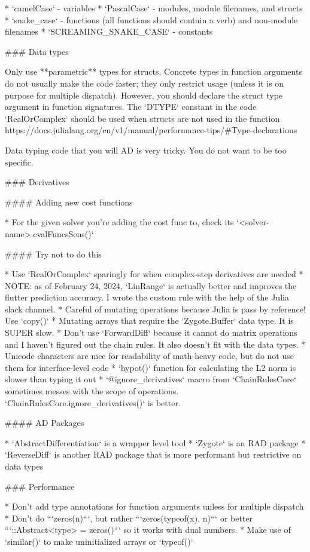 \documentclass[10pt]{article}
\begin{document}
* `camelCase` - variables
* `PascalCase` - modules, module filenames, and structs
* `snake_case` - functions (all functions should contain a verb) and non-module filenames
* `SCREAMING_SNAKE_CASE` - constants

### Data types

Only use **parametric** types for structs. Concrete types in function arguments do not usually make the code faster; they only restrict usage (unless it is on purpose for multiple dispatch). However, you should declare the struct type argument in function signatures. The `DTYPE` constant in the code `RealOrComplex` should be used when structs are not used in the function
https://docs.julialang.org/en/v1/manual/performance-tips/#Type-declarations

Data typing code that you will AD is very tricky.
You do not want to be too specific.

### Derivatives

#### Adding new cost functions

* For the given solver you're adding the cost func to, check its `<solver-name>.evalFuncsSens()`

#### Try not to do this

* Use `RealOrComplex` sparingly for when complex-step derivatives are needed
* NOTE: as of February 24, 2024, `LinRange` is actually better and improves the flutter prediction accuracy.
I wrote the custom rule with the help of the Julia slack channel.
* Careful of mutating operations because Julia is pass by reference! Use `copy()`
* Mutating arrays that require the `Zygote.Buffer` data type. It is SUPER slow.
* Don't use `ForwardDiff` because it cannot do matrix operations and I haven't figured out the chain rules.
It also doesn't fit with the data types.
* Unicode characters are nice for readability of math-heavy code, but do not use them for interface-level code
* `hypot()` function for calculating the L2 norm is slower than typing it out
* `@ignore_derivatives` macro from `ChainRulesCore` sometimes messes with the scope of operations. `ChainRulesCore.ignore_derivatives()` is better.

#### AD Packages

* `AbstractDifferentiation` is a wrapper level tool
* `Zygote` is an RAD package
* `ReverseDiff` is another RAD package that is more performant but restrictive on data types

### Performance

* Don't add type annotations for function arguments unless for multiple dispatch
* Don't do ```zeros(n)```, but rather ```zeros(typeof(x), n)``` or better ```::Abstract<type> = zeros()``` so it works with dual numbers.
* Make use of `similar()` to make uninitialized arrays or `typeof()`
\end{document}
